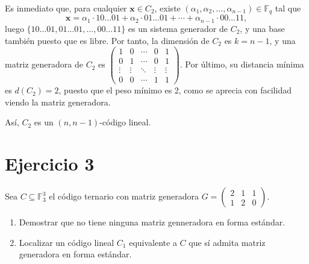 \begin{enumerate}[label=\alph*)]
		Es inmediato que, para cualquier $\textbf{x}\in C_2$, existe $(\alpha_1, \alpha_2, \hdots, \alpha_{n-1})\in\mathbb{F}_q$ tal que
		\[\textbf{x} = \alpha_1\cdot10\hdots01 + \alpha_2\cdot01\hdots01 + \cdots + \alpha_{n-1}\cdot00\hdots11,\]
		luego $\{10\hdots01, 01\hdots01, \hdots, 00\hdots11\}$ es un sistema generador de $C_2$, y una base también puesto que es libre. Por tanto, la dimensión de $C_2$ es $k = n-1$, y una matriz generadora de $C_2$ es $\begin{pmatrix}
			1 & 0 & \cdots & 0 & 1 \\
			0 & 1 & \cdots & 0 & 1 \\
			\vdots & \vdots & \ddots & \vdots & \vdots \\
			0 & 0 & \cdots & 1 & 1
		\end{pmatrix}$. Por último, su distancia mínima es $d(C_2) = 2$, puesto que el peso mínimo es 2, como se aprecia con facilidad viendo la matriz generadora.
		
		Así, $C_2$ es un $(n, n-1)$-código lineal.
\end{enumerate}

\section{Ejercicio 3}

\begin{formulationBox}
	Sea $C \subseteq \mathbb{F}_3^3$ el código ternario con matriz generadora $G = \begin{pmatrix}
	2 & 1 & 1 \\
	1 & 2 & 0
	\end{pmatrix}$.
	
	\begin{enumerate}[label=\alph*)]
		\item Demostrar que no tiene ninguna matriz genneradora en forma estándar.
		\item Localizar un código lineal $C_1$ equivalente a $C$ que sí admita matriz generadora en forma estándar.
	\end{enumerate}
\end{formulationBox}

